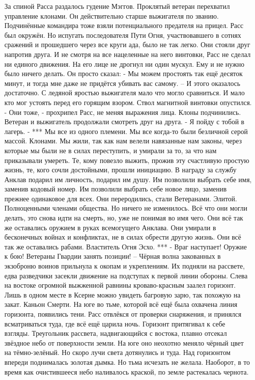 \documentclass[a4paper, 12pt]{report}
\begin{document}
	За спиной Расса раздалось гудение Мэггов. Проклятый ветеран перехватил управление клонами. Он действительно старше выжигателя по званию. Подчинённые командира тоже взяли потенциального предателя на прицел. Расс был окружён.
Но испугать последователя Пути Огня, участвовавшего в сотнях сражений и прошедшего через все круги ада, было не так легко.
Они стояли друг напротив друга. И не смотря на все нацеленные на него винтовки, Расс не сделал ни единого движения. На его лице не дрогнул ни один мускул. Ему и не нужно было ничего делать. Он просто сказал:
	- Мы можем простоять так ещё десяток минут, и тогда мне даже не придётся убивать вас самому. –
	И этого оказалось достаточно.
	С ледяной яростью выжигателя мало что могло сравниться. И мало кто мог устоять перед его горящим взором. Ствол магнитной винтовки опустился.
	- Они тоже, - прохрипел Расс, не меняя выражения лица.
	Клоны подчинились. Ветеран и выжигатель продолжали смотреть друг на друга.
	- Я пойду с тобой в лагерь. -
***
Мы все из одного племени. Мы все когда-то были безличной серой массой. Клонами. Мы жили, так как нам велели навязанные нам законы, через которые мы были не в силах переступить, и умирали за то, за что нам приказывали умереть. Те, кому повезло выжить, прожив эту счастливую простую жизнь, те, кого сочли достойными, прошли инициацию. В награду за службу Анклав подарил им личность, подарил им душу. Им позволили выбрать себе имя, заменив кодовый номер. Им позволили выбрать себе новое лицо, заменив прежнее одинаковое для всех. Они переродились, стали Ветеранами. Элитой. Полноценными членами общества. Но ничего не изменилось. Всё что они могли делать, это снова идти на смерть, но, уже не понимая во имя чего. Они всё так же оставались оружием в руках всемогущего Анклава. Они умирали в бесконечных войнах и конфликтах, не в силах обрести другую жизнь. Они всё так же оставались рабами.
Властитель Огня Эсхо.
***
	- Враг наступает! Оружие к бою! Ветераны Гвардии занять позиции! – 
	Чёрная волна закованных в экзоброню воинов прильнула к окопам и укреплениям. Их подняли на рассвете, едва разведчики засекли движение на подступах к первой линии обороны. Слева на востоке огромной выжженной равнины кроваво-красным заалел горизонт. Лишь в одном месте в Ксерне можно увидеть багровую зарю, так похожую на закат.
	Каньон Смерти.
	На юге во тьме, которой всё ещё была охвачена линия горизонта, появились тени. Расс отвлёкся от проверки снаряжения, и принялся всматриваться туда, где всё ещё царила ночь. Горизонт притягивал к себе взгляды. Треугольник рассвета, надвигающийся с востока, плавно отсекал звёздное небо от поверхности земли. На юге оно неохотно меняло чёрный цвет на тёмно-зелёный. Но скоро лучи света дотянулись и туда. Над горизонтом впереди поднималась золотая дымка. Но тьма исчезать не желала. Наоборот, в то время как очистившееся небо наливалось краской, по земле растекалась чернота.
\end{document}
